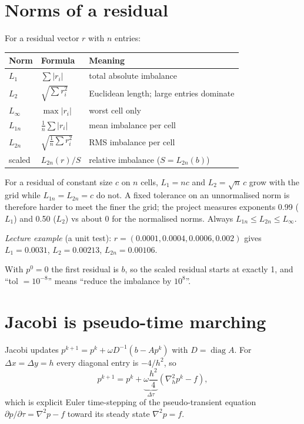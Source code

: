 \section{Norms of a residual}
For a residual vector $r$ with $n$ entries:
\begin{table}[H]\centering\small
\begin{tabular}{@{}lll@{}}\toprule
Norm & Formula & Meaning\\\midrule
$L_1$ & $\sum|r_i|$ & total absolute imbalance\\
$L_2$ & $\sqrt{\sum r_i^2}$ & Euclidean length; large entries dominate\\
$L_\infty$ & $\max|r_i|$ & worst cell only\\
$L_{1n}$ & $\tfrac1n\sum|r_i|$ & mean imbalance per cell\\
$L_{2n}$ & $\sqrt{\tfrac1n\sum r_i^2}$ & RMS imbalance per cell\\
scaled & $L_{2n}(r)/S$ & relative imbalance ($S=L_{2n}(b)$)\\\bottomrule
\end{tabular}\end{table}
For a residual of constant size $c$ on $n$ cells, $L_1=nc$ and $L_2=\sqrt n\,c$ grow with the grid while $L_{1n}=L_{2n}=c$ do not. A fixed tolerance on an unnormalised norm is therefore harder to meet the finer the grid; the project measures exponents 0.99 ($L_1$) and 0.50 ($L_2$) vs about 0 for the normalised norms. Always $L_{1n}\le L_{2n}\le L_\infty$.

\emph{Lecture example} (a unit test): $r=(0.0001,0.0004,0.0006,0.002)$ gives $L_1=0.0031$, $L_2=0.00213$, $L_{2n}=0.00106$.

With $p^0=0$ the first residual is $b$, so the scaled residual starts at exactly 1, and ``tol $=10^{-8}$'' means ``reduce the imbalance by $10^8$''.

\section{Jacobi is pseudo-time marching}
Jacobi updates $p^{k+1}=p^k+\omega D^{-1}(b-Ap^k)$ with $D=\operatorname{diag}A$. For $\Delta x=\Delta y=h$ every diagonal entry is $-4/h^2$, so
\begin{equation}
p^{k+1}=p^k+\underbrace{\omega\frac{h^2}{4}}_{\Delta\tau}\left(\nabla_h^2p^k-f\right),
\end{equation}
which is explicit Euler time-stepping of the pseudo-transient equation $\partial p/\partial\tau=\nabla^2p-f$ toward its steady state $\nabla^2p=f$.

